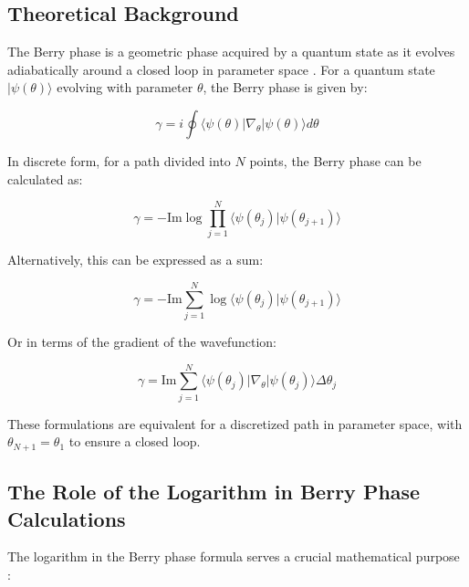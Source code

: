 \documentclass{article}
\begin{document}
\subsection{Theoretical Background}

The Berry phase is a geometric phase acquired by a quantum state as it evolves adiabatically around a closed loop in parameter space \cite{Bernevig2013, Hasan2010}. For a quantum state $|\psi(\theta)\rangle$ evolving with parameter $\theta$, the Berry phase is given by:

\begin{equation}
\gamma = i \oint \langle \psi(\theta) | \nabla_\theta | \psi(\theta) \rangle d\theta
\end{equation}

In discrete form, for a path divided into $N$ points, the Berry phase can be calculated as:

\begin{equation}
\gamma = -\text{Im} \log \prod_{j=1}^{N} \langle \psi(\theta_j) | \psi(\theta_{j+1}) \rangle
\end{equation}

Alternatively, this can be expressed as a sum:

\begin{equation}
\gamma = -\text{Im} \sum_{j=1}^{N} \log \langle \psi(\theta_j) | \psi(\theta_{j+1}) \rangle
\end{equation}

Or in terms of the gradient of the wavefunction:

\begin{equation}
\gamma = \text{Im} \sum_{j=1}^{N} \langle \psi(\theta_j) | \nabla_\theta | \psi(\theta_j) \rangle \Delta\theta_j
\end{equation}

These formulations are equivalent for a discretized path in parameter space, with $\theta_{N+1} = \theta_1$ to ensure a closed loop.

\subsection{The Role of the Logarithm in Berry Phase Calculations}

The logarithm in the Berry phase formula serves a crucial mathematical purpose \cite{Xiao2010, Vanderbilt2018, Resta2000}:
\end{document}
